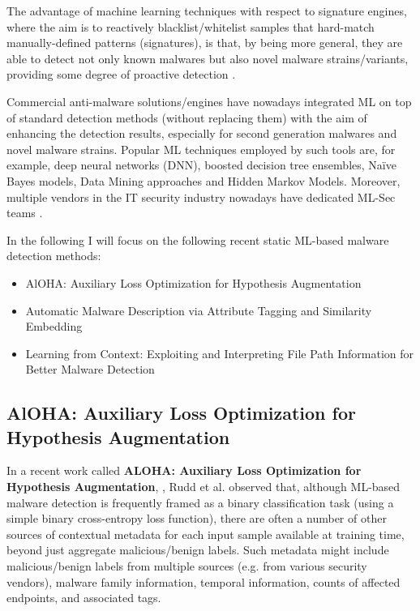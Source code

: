 \documentclass[pdfa%
,cucitura%
]{toptesi}
\begin{document}
The advantage of machine learning techniques with respect to signature engines, where the aim is to reactively blacklist/whitelist samples that hard-match manually-defined patterns (signatures), is that, by being more general, they are able to detect not only known malwares but also novel malware strains/variants, providing some degree of proactive detection \cite{NguyenSPVD}.

Commercial anti-malware solutions/engines have nowadays integrated ML on top of standard detection methods (without replacing them) with the aim of enhancing the detection results, especially for second generation malwares and novel malware strains. Popular ML techniques employed by such tools are, for example, deep neural networks (DNN), boosted decision tree ensembles, Na\"ive Bayes models, Data Mining approaches and Hidden Markov Models. Moreover, multiple vendors in the IT security industry nowadays have dedicated ML-Sec teams \cite{Sharma_2014}.

In the following I will focus on the following recent static ML-based malware detection methods:
\begin{itemize}
	\item AlOHA: Auxiliary Loss Optimization for Hypothesis Augmentation
	
	\item Automatic Malware Description via Attribute Tagging and Similarity Embedding
	
	\item Learning from Context: Exploiting and Interpreting File Path Information for Better Malware Detection
\end{itemize}

\subsection{AlOHA: Auxiliary Loss Optimization for Hypothesis Augmentation}
In a recent work called \textbf{ALOHA: Auxiliary Loss Optimization for Hypothesis Augmentation}, \cite{ruddALOHA}, Rudd et al. observed that, although ML-based malware detection is frequently framed as a binary classification task (using a simple binary cross-entropy loss function), there are often a number of other sources of contextual metadata for each input sample available at training time, beyond just aggregate malicious/benign labels. Such metadata might include malicious/benign labels from multiple sources (e.g. from various security vendors), malware family information, temporal information, counts of affected endpoints, and associated tags.
\end{document}
